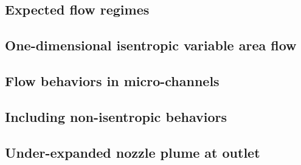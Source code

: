 \subsection{Expected flow regimes}\label{sec:expected-flow-regimes}
	

\subsection{One-dimensional isentropic variable area flow}\label{sec:one-dim-isentropic}
	

\subsection{Flow behaviors in micro-channels}\label{sec:micro-channels}
	

\subsection{Including non-isentropic behaviors}\label{sec:disconnected-reservoirs}
	

\subsection{Under-expanded nozzle plume at outlet}\label{sec:outlet_plume}
	
